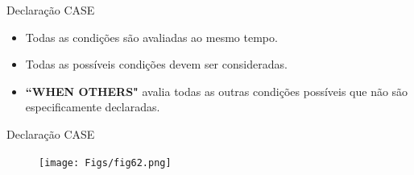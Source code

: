 \documentclass[aspectratio=169]{beamer}
\begin{document}
\begin{frame}{Declaração CASE}
	\justifying
	
	
	\begin{block}{}
	\begin{itemize}
		\item Todas as condições são avaliadas ao mesmo tempo.
		\item Todas as possíveis condições devem ser consideradas. 
		\item \textbf{``WHEN OTHERS"} avalia todas as outras condições possíveis que não são especificamente declaradas.
	\end{itemize}
	
	\end{block}	
	
\end{frame}

\begin{frame}{Declaração CASE}
	\justifying
	
	\begin{figure}[h]
		\centering
		\texttt{[image: Figs/fig62.png]}
	\end{figure}
	
\end{frame}
\end{document}
